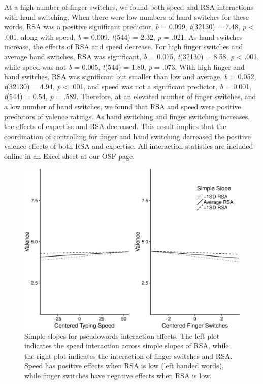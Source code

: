 \documentclass[english,man]{apa6}
\theoremstyle{definition}
\theoremstyle{definition}
\theoremstyle{definition}
\theoremstyle{remark}
\begin{document}
At a high number of finger switches, we found both speed and RSA
interactions with hand switching. When there were low numbers of hand
switches for these words, RSA was a positive significant predictor,
\emph{b} = 0.099, \emph{t}(32130) = 7.48, \emph{p} \textless{} .001,
along with speed, \emph{b} = 0.009, \emph{t}(544) = 2.32, \emph{p} =
.021. As hand switches increase, the effects of RSA and speed decrease.
For high finger switches and average hand switches, RSA was significant,
\emph{b} = 0.075, \emph{t}(32130) = 8.58, \emph{p} \textless{} .001,
while speed was not \emph{b} = 0.005, \emph{t}(544) = 1.80, \emph{p} =
.073. With high finger and hand switches, RSA was significant but
smaller than low and average, \emph{b} = 0.052, \emph{t}(32130) = 4.94,
\emph{p} \textless{} .001, and speed was not a significant predictor,
\emph{b} = 0.001, \emph{t}(544) = 0.54, \emph{p} = .589. Therefore, at
an elevated number of finger switches, and a low number of hand
switches, we found that RSA and speed were positive predictors of
valence ratings. As hand switching and finger switching increases, the
effects of expertise and RSA decreased. This result implies that the
coordination of controlling for finger and hand switching decreased the
positive valence effects of both RSA and expertise. All interaction
statistics are included online in an Excel sheet at our OSF page.

\begin{figure}
\centering
\includegraphics{QWERTY_files/figure-latex/graphs-1.pdf}
\caption{\label{fig:graphs}Simple slopes for pseudowords interaction
effects. The left plot indicates the speed interaction across simple
slopes of RSA, while the right plot indicates the interaction of finger
switches and RSA. Speed has positive effects when RSA is low (left
handed words), while finger switches have negative effects when RSA is
low.}
\end{figure}
\end{document}
